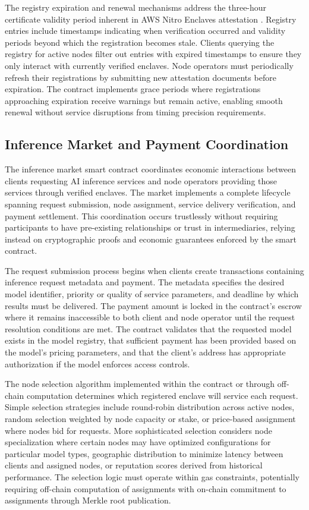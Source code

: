 The registry expiration and renewal mechanisms address the three-hour certificate validity period inherent in AWS Nitro Enclaves attestation \cite{nitro_security}. Registry entries include timestamps indicating when verification occurred and validity periods beyond which the registration becomes stale. Clients querying the registry for active nodes filter out entries with expired timestamps to ensure they only interact with currently verified enclaves. Node operators must periodically refresh their registrations by submitting new attestation documents before expiration. The contract implements grace periods where registrations approaching expiration receive warnings but remain active, enabling smooth renewal without service disruptions from timing precision requirements.

\subsection{Inference Market and Payment Coordination}

The inference market smart contract coordinates economic interactions between clients requesting AI inference services and node operators providing those services through verified enclaves. The market implements a complete lifecycle spanning request submission, node assignment, service delivery verification, and payment settlement. This coordination occurs trustlessly without requiring participants to have pre-existing relationships or trust in intermediaries, relying instead on cryptographic proofs and economic guarantees enforced by the smart contract.

The request submission process begins when clients create transactions containing inference request metadata and payment. The metadata specifies the desired model identifier, priority or quality of service parameters, and deadline by which results must be delivered. The payment amount is locked in the contract's escrow where it remains inaccessible to both client and node operator until the request resolution conditions are met. The contract validates that the requested model exists in the model registry, that sufficient payment has been provided based on the model's pricing parameters, and that the client's address has appropriate authorization if the model enforces access controls.

The node selection algorithm implemented within the contract or through off-chain computation determines which registered enclave will service each request. Simple selection strategies include round-robin distribution across active nodes, random selection weighted by node capacity or stake, or price-based assignment where nodes bid for requests. More sophisticated selection considers node specialization where certain nodes may have optimized configurations for particular model types, geographic distribution to minimize latency between clients and assigned nodes, or reputation scores derived from historical performance. The selection logic must operate within gas constraints, potentially requiring off-chain computation of assignments with on-chain commitment to assignments through Merkle root publication.

